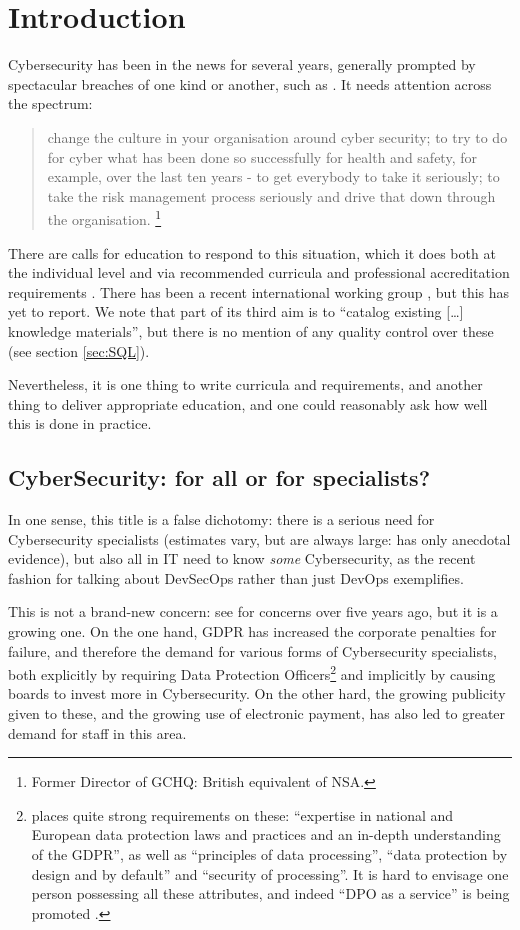 \documentclass[conference]{IEEEtran}
\begin{document}
\section{Introduction}

Cybersecurity has been in the news for several years, generally prompted by spectacular breaches of one kind or another, such as \cite{BritishAirways2018a}.
It needs attention across the spectrum:
\begin{quote}
change the culture in your organisation around cyber security; to try to do for cyber what has been done so successfully for health and safety, for example, over the last ten years - to get everybody to take it seriously; to take the risk management process seriously and drive that down through the organisation. \cite{Hannigan2019a}\footnote{Former Director of GCHQ: British equivalent of NSA.}
\end{quote}

There are calls for education to respond to this situation, which it does both at the individual level and via recommended curricula \cite{ACM2013a} and professional accreditation requirements \cite{BCS2018a}. There has been a recent international working group \cite{Parrishetal2018a}, but this has yet to report.  We note that part of its third aim is to ``catalog existing [\dots] knowledge materials'', but there is no mention of any quality control over these (see section \ref{sec:SQL}).

Nevertheless, it is one thing to write curricula and requirements, and
another thing to deliver appropriate education, and one could
reasonably ask how well this is done in practice.
\subsection{CyberSecurity: for all or for specialists?}
In one sense, this title is a false dichotomy: there is a serious need for Cybersecurity specialists (estimates vary, but are always large: \cite{JCNSS2018a} has only anecdotal evidence), but also all in IT need to know \emph{some} Cybersecurity, as the recent fashion for talking about DevSecOps rather than just DevOps exemplifies.

This is not a brand-new concern: see \cite{Parr2014a} for concerns over five years ago, but it is a growing one. On the one hand, GDPR has increased the corporate penalties for failure, and therefore the demand for various forms of Cybersecurity specialists, both explicitly by requiring Data Protection Officers\footnote{\cite{EU292016a} places quite strong requirements on these: ``expertise in national and European data protection laws and practices and an in-depth understanding of the GDPR'', as well as ``principles of data processing'', ``data protection by design and by default'' and ``security of processing''. It is hard to envisage one person possessing all these attributes, and indeed ``DPO as a service'' is being promoted \cite{McCreanor2018d}.} and implicitly by causing boards to invest more in Cybersecurity. On the other hard, the growing publicity given to these, and the growing use of electronic payment, has also led to greater demand for staff in this area.
\end{document}
